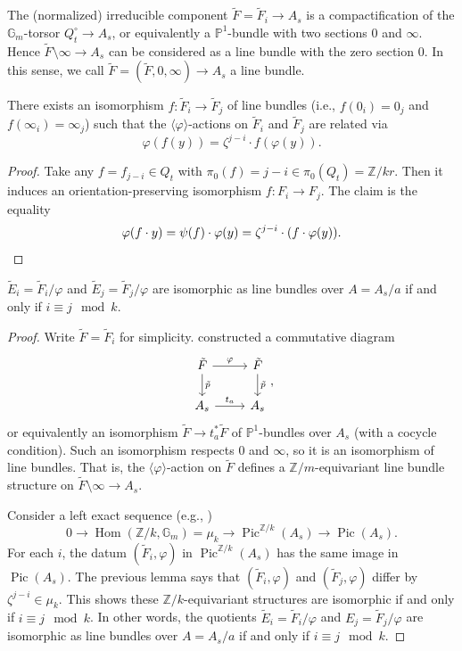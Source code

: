 \documentclass[reqno, letterpaper]{amsart}
\numberwithin{equation}{subsection}
\let\to\longrightarrow
\newcommand{\GG}{\mathbb{G}}
\newcommand{\PP}{\mathbb{P}}
\newcommand{\ZZ}{\mathbb{Z}}
\DeclareMathOperator{\Hom}{Hom}
\DeclareMathOperator{\Pic}{Pic}
\begin{document}
			The (normalized) irreducible component $\tilde F = \tilde F_i \to A_s$ is a compactification of the $\GG_m$-torsor $Q_t^\circ \to A_s$, or equivalently a $\PP^1$-bundle with two sections $0$ and $\infty$. Hence $\tilde F \setminus \infty \to A_s$ can be considered as a line bundle with the zero section $0$. In this sense, we call $\tilde F = (\tilde F, 0, \infty) \to A_s$ a line bundle.
			
			\begin{lemma}
				There exists an isomorphism $f : \tilde F_i \to \tilde F_j$ of line bundles (i.e., $f(0_i) = 0_j$ and $f(\infty_i) = \infty_j$) such that the $\langle \varphi \rangle$-actions on $\tilde F_i$ and $\tilde F_j$ are related via
				\[ \varphi(f(y)) = \zeta^{j-i} \cdot f(\varphi(y)) .\]
			\end{lemma}
			\begin{proof}
				Take any $f = f_{j-i} \in Q_t$ with $\pi_0(f) = j-i \in \pi_0(Q_t) = \ZZ/kr$. Then it induces an orientation-preserving isomorphism $f : F_i \to F_j$. The claim is the equality
				\[ \varphi(f \cdot y) = \psi(f) \cdot \varphi(y) = \zeta^{j-i} \cdot (f \cdot \varphi (y)) .\qedhere\]
			\end{proof}
			
			\begin{lemma} \label{lem:classification of multiple fiber iii:description of E_i}
				$\tilde E_i = \tilde F_i/\varphi$ and $\tilde E_j = \tilde F_j/\varphi$ are isomorphic as line bundles over $A = A_s/a$ if and only if $i \equiv j \mod k$.
			\end{lemma}
			\begin{proof}
				Write $\tilde F = \tilde F_i$ for simplicity.  constructed a commutative diagram
				\[\begin{tikzcd}
					\tilde F \arrow[r, "\varphi"] \arrow[d, "\tilde p"] & \tilde F \arrow[d, "\tilde p"] \\
					A_s \arrow[r, "t_a"] & A_s
				\end{tikzcd},\]
				or equivalently an isomorphism $\tilde F \to t_a^* \tilde F$ of $\PP^1$-bundles over $A_s$ (with a cocycle condition). Such an isomorphism respects $0$ and $\infty$, so it is an isomorphism of line bundles. That is, the $\langle \varphi \rangle$-action on $\tilde F$ defines a $\ZZ/m$-equivariant line bundle structure on $\tilde F \setminus \infty \to A_s$.
				
				Consider a left exact sequence (e.g., \cite[\S 7.1]{dol:invariant})
				\[ 0 \to \Hom (\ZZ/k, \GG_m) = \mu_k \to \Pic^{\ZZ/k}(A_s) \to \Pic(A_s) .\]
				For each $i$, the datum $(\tilde F_i, \varphi)$ in $\Pic^{\ZZ/k}(A_s)$ has the same image in $\Pic(A_s)$. The previous lemma says that $(\tilde F_i, \varphi)$ and $(\tilde F_j, \varphi)$ differ by $\zeta^{j-i} \in \mu_k$. This shows these $\ZZ/k$-equivariant structures are isomorphic if and only if $i \equiv j \mod k$. In other words, the quotients $\tilde E_i = \tilde F_i/\varphi$ and $E_j = \tilde F_j/\varphi$ are isomorphic as line bundles over $A = A_s/a$ if and only if $i \equiv j \mod k$.
			\end{proof}
			
\end{document}
